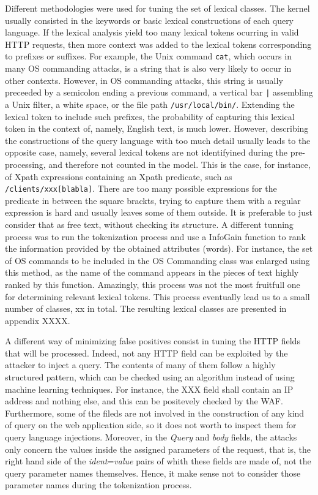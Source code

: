 \documentclass[runningheads,a4paper]{llncs}
\begin{document}
Different methodologies were used for tuning the set of lexical classes. The kernel usually consisted in the keywords or basic lexical constructions of each query language. If the lexical analysis yield too many lexical tokens ocurring in valid HTTP requests, then more context was added to the lexical tokens corresponding to prefixes or suffixes. For example, the Unix command \texttt{cat}, which occurs in many OS commanding attacks, is a string that is also very likely to occur in other contexts. However, in OS commanding attacks, this string is usually preceeded by a semicolon ending a previous command, a vertical bar \texttt{|} assembling a Unix filter, a white space, or the file path \texttt{/usr/local/bin/}. Extending the lexical token to include such prefixes, the probability of capturing this lexical token in the context of, namely, English text, is much lower. However, describing the constructions of the query language with too much detail usually leads to the opposite case, namely, several lexical tokens are not identifyined during the pre-processing, and therefore not counted in the model. This is the case, for instance, of Xpath expressions containing an Xpath predicate, such as \texttt{/clients/xxx[blabla]}. There are too many possible expressions for the predicate in between the square brackts, trying to capture them with a regular expression is hard and usually leaves some of them outside. It is preferable to just consider that as free text, without checking its structure. A different tunning process was to run the tokenization process and use a InfoGain function to rank the information provided by the obtained attributes (words). For instance, the set of OS commands to be included in the OS Commanding class was enlarged using this method, as the name of the command appears in the pieces of text highly ranked by this function. Amazingly, this process was not the most fruitfull one for determining relevant lexical tokens. This process eventually lead us to a small number of classes, xx in total. The resulting lexical classes are presented in appendix XXXX.

A different way of minimizing false positives consist in tuning the HTTP fields that will be processed. Indeed, not any HTTP field can be exploited by the attacker to inject a query. The contents of many of them follow a highly structured pattern, which can be checked using an algorithm instead of using machine learning techniques. For instance, the XXX field shall contain an IP address and nothing else, and this can be positevely checked by the WAF. Furthermore, some of the fileds are not involved in the construction of any kind of query on the web application side, so it does not worth to inspect them for query language injections. Moreover, in the \textit{Query} and \textit{body} fields, the attacks only concern the values inside the assigned parameters of the request, that is, the right hand side of the \textit{ident}=\textit{value} pairs of whith these fields are made of, not the query parameter names themselves. Hence, it make sense not to consider those parameter names during the tokenization process.
\end{document}
